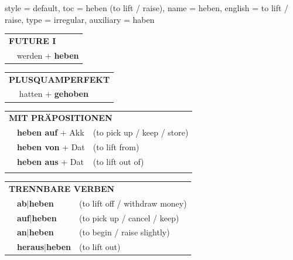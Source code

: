 \begin{verbentry}{
  style = {default},
  toc = {heben (to lift / raise)},
  name = {heben},
  english = {to lift / raise},
  type = {irregular},
  auxiliary = {haben}
}
\begin{tabular}{rl}
    \multicolumn{2}{l}{\textbf{FUTURE I} }\\
   & werden + \textbf{heben}\\
 
  \end{tabular}
\hfill
   \begin{tabular}{rl}
      \multicolumn{2}{l}{\textbf{PLUSQUAMPERFEKT}}\\
   & hatten + \textbf{gehoben}\\
  \end{tabular}

   \vspace{10pt}

   \begin{tabular}{lll}
      \multicolumn{3}{l}{\textbf{MIT PRÄPOSITIONEN}}\\
& \textbf{heben auf} + Akk & (to pick up / keep / store)\\
& \textbf{heben von} + Dat & (to lift from)\\
& \textbf{heben aus} + Dat & (to lift out of)\\
\vspace{10pt}
   \end{tabular}
  \hfill
   \begin{tabular}{lll}
      \multicolumn{3}{l}{\textbf{TRENNBARE VERBEN}}\\
 & \textbf{ab$|$heben} & (to lift off / withdraw money)\\
 & \textbf{auf$|$heben} & (to pick up / cancel / keep)\\
 & \textbf{an$|$heben} & (to begin / raise slightly)\\
 & \textbf{heraus$|$heben} & (to lift out)\\
  \end{tabular}

\vspace{-5pt}
\end{verbentry}

